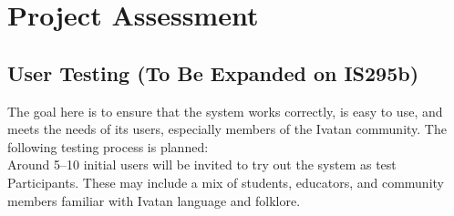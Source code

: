 
\section{Project Assessment}
    \subsection{User Testing (To Be Expanded on IS295b)}
    The goal here is to ensure that the system works correctly, is easy to use, and meets the needs of its users, especially members of the Ivatan community. The following testing process is planned:\\
    Around 5–10 initial users will be invited to try out the system as test Participants. These may include a mix of students, educators, and community members familiar with Ivatan language and folklore.

